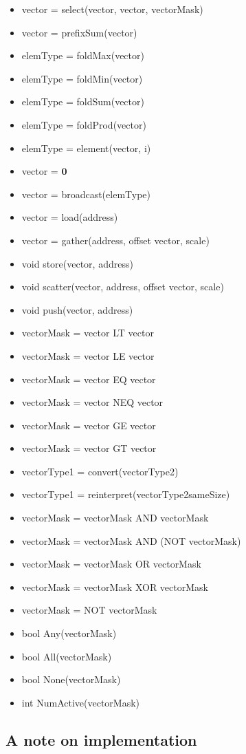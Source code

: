 \documentclass[11pt]{amsart}
\begin{document}
\begin{itemize}
\item vector = select(vector, vector, vectorMask)
\item vector = prefixSum(vector)
\item elemType = foldMax(vector)
\item elemType = foldMin(vector)
\item elemType = foldSum(vector)
\item elemType = foldProd(vector)
\item elemType = element(vector, i)
\item vector = $\mathbf{0}$
\item vector = broadcast(elemType)
\item vector = load(address)
\item vector = gather(address, offset vector, scale) 
\item void store(vector, address)
\item void scatter(vector, address, offset vector, scale)
\item void push(vector, address)
\item vectorMask = vector LT vector 
\item vectorMask = vector LE vector 
\item vectorMask = vector EQ vector
\item vectorMask = vector NEQ vector
\item vectorMask = vector GE vector
\item vectorMask = vector GT vector
\item vectorType1 = convert(vectorType2)
\item vectorType1 = reinterpret(vectorType2sameSize)
\item vectorMask = vectorMask AND vectorMask
\item vectorMask = vectorMask AND (NOT vectorMask)
\item vectorMask = vectorMask OR vectorMask
\item vectorMask = vectorMask XOR vectorMask
\item vectorMask = NOT vectorMask
\item bool Any(vectorMask) 
\item bool All(vectorMask)
\item bool None(vectorMask)
\item int NumActive(vectorMask)
\end{itemize} 

\subsection{A note on implementation}
\end{document}
